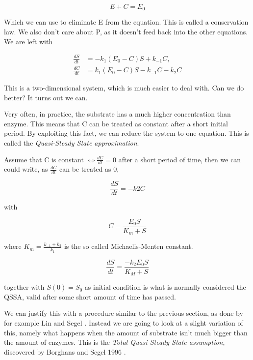 \documentclass[12pt]{article}
\begin{document}
\begin{equation}
E + C = E_0
\end{equation}

Which we can use to eliminate E from the equation. This is called a conservation
law.  We also don't care about P, as it doesn't feed back into the other
equations. We are left with

\begin{align}
\frac{dS}{dt} &= -k_1(E_0 - C)S + k_{-1}C, \\
\frac{dC}{dt} &= k_1(E_0 - C)S - k_{-1}C - k_2 C
\end{align}

This is a two-dimensional system, which is much easier to deal with. Can we do
better? It turns out we can.

Very often, in practice, the substrate has a much higher concentration than enzyme. This
means that C can be treated as constant after a short initial period. By
exploiting this fact, we can reduce the system to one equation. This is called
the \textit{Quasi-Steady State approximation}.

Assume that C is constant $\iff \frac{dC}{dt} = 0$ after a short period of time,
then we can could write, as $\frac{dC}{dt}$ can be treated as 0,

\begin{equation}
\frac{dS}{dt} = -k2 C
\end{equation}

with

\begin{equation}
C = \frac{E_0 S}{K_m +S}
\end{equation}

where $K_m = \frac{k_{-1} + k_2}{k_1}$ is the so called {Michaelis-Menten
constant}.

\begin{equation}
\frac{dS}{dt} = \frac{-k_2 E_0 S}{K_M + S}
\end{equation}

together with $S(0) = S_0$ as initial condition is what is normally considered
the QSSA, valid after some short amount of time has passed.

We can justify this with a procedure similar to the previous section, as done by
for example Lin and Segel \cite{lin1974mathematics}. Instead we are going to
look at a slight variation of this, namely what happens when the amount of
substrate isn't much bigger than the amount of enzymes. This is the
\textit{Total Quasi Steady State assumption}, discovered by Borghans and Segel
1996 \cite{borghans1996extending}.
\end{document}

